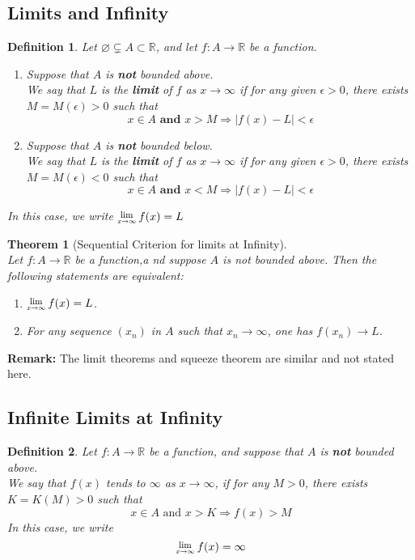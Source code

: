 \documentclass[12pt]{article}
\newcommand{\Lim}[1]{\raisebox{0.5ex}{\scalebox{0.8}{$\displaystyle \lim_{#1}\;$}}}
\newtheorem{definition}{Definition}[section]
\newtheorem{theorem}{Theorem}[section]
\theoremstyle{definition}
\begin{document}
\subsection{Limits and Infinity}
\begin{definition}\normalfont Let $\varnothing\subsetneq A\subset \mathbb{R}$, and let $f:A\to \mathbb{R}$ be a function.
\begin{enumerate}
\item Suppose that $A$ is \textbf{not} bounded above.\\
We say that $L$ is the \textbf{limit} of $f$ as $x\to \infty$ if for any given $\epsilon>0$, there exists $M=M(\epsilon)>0$ such that
\[
x\in A \textbf{ and } x>M\Rightarrow |f(x)-L|<\epsilon
\]
\item Suppose that $A$ is \textbf{not} bounded below.\\
We say that $L$ is the \textbf{limit} of $f$ as $x\to \infty$ if for any given $\epsilon>0$, there exists $M=M(\epsilon)<0$ such that
\[
x\in A \textbf{ and } x<M\Rightarrow |f(x)-L|<\epsilon
\]
\end{enumerate}
In this case, we write $\Lim{x\to \infty}f(x)=L$
\end{definition}
\begin{theorem}[Sequential Criterion for limits at Infinity]
\hfill\\\normalfont Let $f:A\to\mathbb{R}$ be a function,a nd suppose $A$ is not bounded above. Then the following statements are equivalent:
\begin{enumerate}
\item $\Lim{x\to\infty}f(x)=L$.
\item For any sequence $(x_n)$ in $A$ such that $x_n\to\infty$, one has $f(x_n)\to L$.
\end{enumerate}
\end{theorem}
\textbf{Remark:} The limit theorems and squeeze theorem are similar and not stated here.
\subsection{Infinite Limits at Infinity}
\begin{definition}\normalfont Let $f:A\to \mathbb{R}$ be a function, and suppose that $A$ is \textbf{not} bounded above.\\
We say that $f(x)$ tends to $\infty$ as $x\to \infty$, if for any $M>0$, there exists $K=K(M)>0$ such that
\[
x\in A \text{ and }x>K\Rightarrow f(x)>M
\]
In this case, we write
\[
\Lim{x\to\infty}f(x)=\infty
\]
\end{definition}
\clearpage
\end{document}
